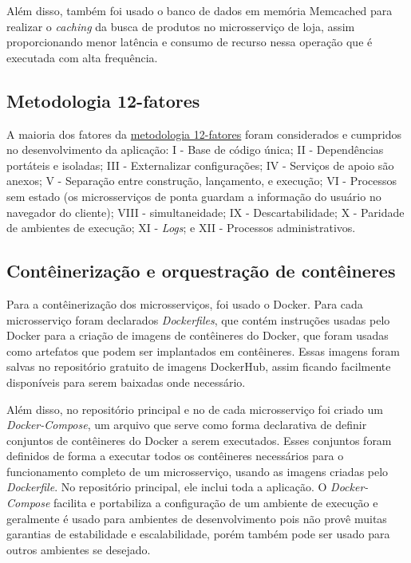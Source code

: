 Além disso, também foi usado o banco de dados em memória Memcached para realizar o \emph{caching} da busca de produtos no microsserviço de loja, assim proporcionando menor latência e consumo de recurso nessa operação que é executada com alta frequência.

\subsection{Metodologia 12-fatores}
A maioria dos fatores da \hyperref[metodologia-12-fatores]{metodologia 12-fatores} foram considerados e cumpridos no desenvolvimento da aplicação: I - Base de código única; II - Dependências portáteis e isoladas; III - Externalizar configurações; IV - Serviços de apoio são anexos; V - Separação entre construção, lançamento, e execução; VI - Processos sem estado (os microsserviços de ponta guardam a informação do usuário no navegador do cliente); VIII - simultaneidade; IX - Descartabilidade; X - Paridade de ambientes de execução; XI - \emph{Logs}; e XII - Processos administrativos.

\subsection{Contêinerização e orquestração de contêineres}
Para a contêinerização dos microsserviços, foi usado o Docker. Para cada microsserviço foram declarados \emph{Dockerfiles}, que contém instruções usadas pelo Docker para a criação de imagens de contêineres do Docker, que foram usadas como artefatos que podem ser implantados em contêineres. Essas imagens foram salvas no repositório gratuito de imagens DockerHub, assim ficando facilmente disponíveis para serem baixadas onde necessário.

Além disso, no repositório principal e no de cada microsserviço foi criado um \emph{Docker-Compose}, um arquivo que serve como forma declarativa de definir conjuntos de contêineres do Docker a serem executados. Esses conjuntos foram definidos de forma a executar todos os contêineres necessários para o funcionamento completo de um microsserviço, usando as imagens criadas pelo \emph{Dockerfile}. No repositório principal, ele inclui toda a aplicação. O \emph{Docker-Compose} facilita e portabiliza a configuração de um ambiente de execução e geralmente é usado para ambientes de desenvolvimento pois não provê muitas garantias de estabilidade e escalabilidade, porém também pode ser usado para outros ambientes se desejado.

